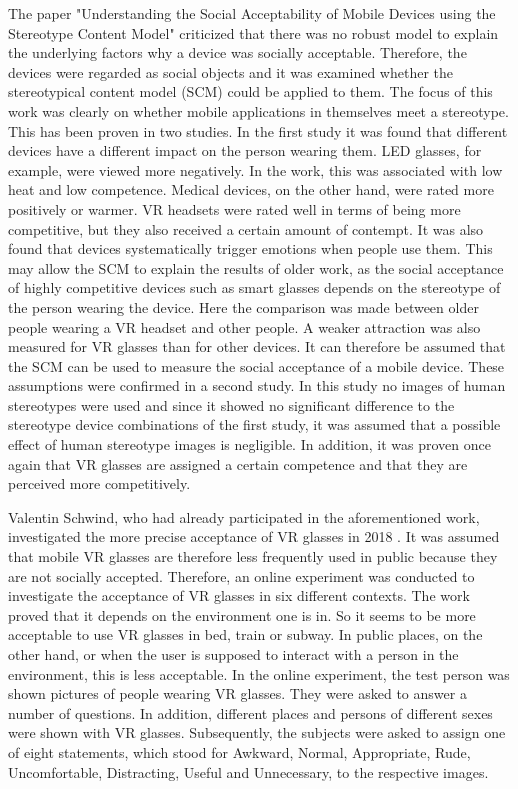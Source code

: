 \documentclass[sigchi]{acmart}
\begin{document}
The paper "Understanding the Social Acceptability of Mobile Devices using the Stereotype Content Model" \cite{schwind2019understanding} criticized that there was no robust model to explain the underlying factors why a device was socially acceptable. Therefore, the devices were regarded as social objects and it was examined whether the stereotypical content model (SCM) could be applied to them. The focus of this work was clearly on whether mobile applications in themselves meet a stereotype. This has been proven in two studies. In the first study it was found that different devices have a different impact on the person wearing them. LED glasses, for example, were viewed more negatively. In the work, this was associated with low heat and low competence. Medical devices, on the other hand, were rated more positively or warmer. VR headsets were rated well in terms of being more competitive, but they also received a certain amount of contempt. It was also found that devices systematically trigger emotions when people use them. This may allow the SCM to explain the results of older work, as the social acceptance of highly competitive devices such as smart glasses depends on the stereotype of the person wearing the device. Here the comparison was made between older people wearing a VR headset and other people. A weaker attraction was also measured for VR glasses than for other devices. It can therefore be assumed that the SCM can be used to measure the social acceptance of a mobile device. These assumptions were confirmed in a second study. In this study no images of human stereotypes were used and since it showed no significant difference to the stereotype device combinations of the first study, it was assumed that a possible effect of human stereotype images is negligible. In addition, it was proven once again that VR glasses are assigned a certain competence and that they are perceived more competitively.

Valentin Schwind, who had already participated in the aforementioned work, investigated the more precise acceptance of VR glasses in 2018 \cite{schwind2018virtual}. It was assumed that mobile VR glasses are therefore less frequently used in public because they are not socially accepted. Therefore, an online experiment was conducted to investigate the acceptance of VR glasses in six different contexts. The work proved that it depends on the environment one is in. So it seems to be more acceptable to use VR glasses in bed, train or subway. In public places, on the other hand, or when the user is supposed to interact with a person in the environment, this is less acceptable. 
In the online experiment, the test person was shown pictures of people wearing VR glasses. They were asked to answer a number of questions. In addition, different places and persons of different sexes were shown with VR glasses. Subsequently, the subjects were asked to assign one of eight statements, which stood for Awkward, Normal, Appropriate, Rude, Uncomfortable, Distracting, Useful and Unnecessary, to the respective images.
\end{document}
